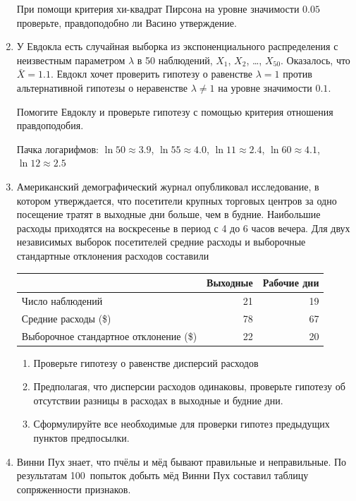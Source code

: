 \begin{enumerate}
При помощи критерия хи-квадрат Пирсона на уровне значимости $0.05$ проверьте,
правдоподобно ли Васино утверждение.

\item У Евдокла есть случайная выборка из экспоненциального распределения с
неизвестным параметром $\lambda$ в 50 наблюдений, $X_1$, $X_2$, \ldots, $X_{50}$.
Оказалось, что $\bar X = 1.1$. Евдокл хочет проверить гипотезу о равенстве
$\lambda = 1$ против альтернативной гипотезы о неравенстве $\lambda \neq 1$ на
уровне значимости $0.1$.

Помогите Евдоклу и проверьте гипотезу с помощью критерия отношения правдоподобия.

Пачка логарифмов: $\ln 50 \approx 3.9$, $\ln 55 \approx 4.0$, $\ln 11 \approx 2.4$,
$\ln 60 \approx 4.1$, $\ln 12 \approx 2.5$

\item Американский демографический журнал опубликовал исследование, в котором
утверждается, что посетители крупных торговых центров за одно посещение тратят
в выходные дни больше, чем в будние. Наибольшие расходы приходятся на воскресенье
в период с 4 до 6 часов вечера. Для двух независимых выборок посетителей средние
расходы и выборочные стандартные отклонения расходов составили
\begin{center}
\begin{tabular}{lrr}
\toprule
 & Выходные & Рабочие дни \\
\midrule
Число наблюдений & 21 & 19 \\
Средние расходы (\$) & 78 & 67 \\
Выборочное стандартное отклонение (\$) & 22 & 20 \\
\bottomrule
\end{tabular}
\end{center}

\begin{enumerate}
\item Проверьте гипотезу о равенстве дисперсий расходов
\item Предполагая, что дисперсии расходов одинаковы, проверьте гипотезу об отсутствии
разницы в расходах в выходные и будние дни.
\item Сформулируйте все необходимые для проверки гипотез предыдущих пунктов предпосылки.
\end{enumerate}

\item Винни Пух знает, что пчёлы и мёд бывают правильные и неправильные.
По результатам 100~попыток добыть мёд Винни Пух составил таблицу сопряженности признаков.


\end{enumerate}
